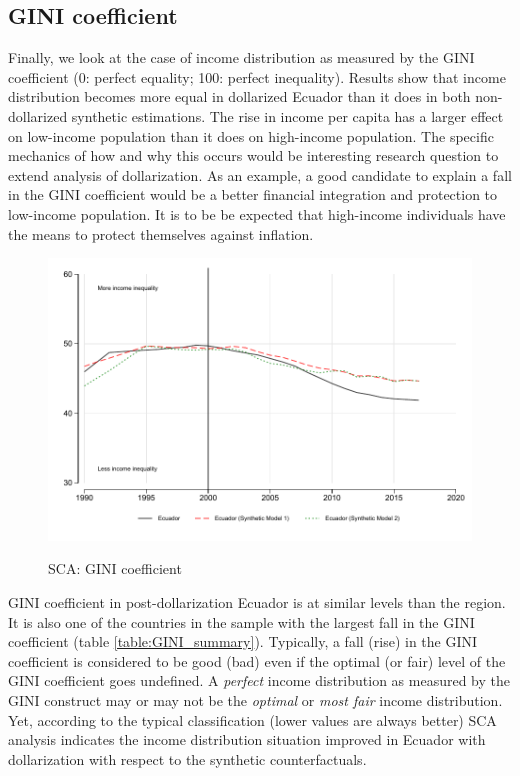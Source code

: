 \documentclass[12pt]{article}
\begin{document}
\subsection{GINI coefficient}

Finally, we look at the case of income distribution as measured by the GINI coefficient (0: perfect equality; 100: perfect inequality). Results show that income distribution becomes more equal in dollarized Ecuador than it does in both non-dollarized synthetic estimations. The rise in income per capita has a larger effect on low-income population than it does on high-income population. The specific mechanics of how and why this occurs would be interesting research question to extend analysis of dollarization. As an example, a good candidate to explain a fall in the GINI coefficient would be a better financial integration and protection to low-income population. It is to be be expected that high-income individuals have the means to protect themselves against inflation.



\begin{figure}[!h]
    \caption{SCA: GINI coefficient}
    \centering
    \includegraphics{STATA/Fig_GINI_SCA.pdf}
    \label{fig:GINI}
\end{figure}



GINI coefficient in post-dollarization Ecuador is at similar levels than the region. It is also one of the countries in the sample with the largest fall in the GINI coefficient (table \ref{table:GINI_summary}). Typically, a fall (rise) in the GINI coefficient is considered to be good (bad) even if the optimal (or fair) level of the GINI coefficient goes undefined. A \textit{perfect} income distribution as measured by the GINI construct may or may not be the \textit{optimal} or \textit{most fair} income distribution. Yet, according to the typical classification (lower values are always better) SCA analysis indicates the income distribution situation improved in Ecuador with dollarization with respect to the synthetic counterfactuals.
\end{document}
